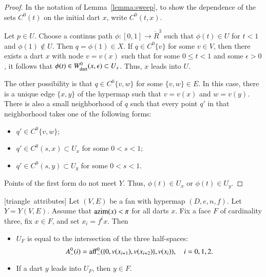 \begin{proof}  
In the notation of Lemma~\ref{lemma:sweep}, to show the dependence of the sets $C^0(t)$ on the initial dart $x$, write $C^0(t,x)$.

Let $p\in U$.  Choose a continus path $\phi:[0,1]\to \ring{R}^3$
such that $\phi(t)\in U$ for $t<1$ and $\phi(1)\not\in U$.  Then
$q=\phi(1)\in X$.  If $q\in C^0\{v\}$ for some $v\in V$,
then there exists a dart $x$ with node $v = v(x)$ such that for some $0\le t < 1$ and some $\epsilon>0$, it follows that $\phi(t)\in W^0_{\text{dart}}(x,\epsilon)\subset U_x$.  
Thus, $x$ leads into $U$.

The other possibility is that
$q\in C^0\{v,w\}$ for some $\{v,w\}\in E$.  In this case, there is a unique
edge $\{x,y\}$ of the hypermap such that $v=v(x)$ and $w=v(y)$.  
There
is also a small neighborhood of $q$ such that every point $q'$ in that neighborhood
takes one of the following forms:
\begin{itemize} \item $q'\in C^0\{v,w\}$;
\item $q'\in C^0(s,x)\subset U_x$ for some $0<s<1$;
\item $q'\in C^0(s,y)\subset U_y$ for some $0<s<1$.
\end{itemize}
Points of the first form do not meet $Y$.  Thus,  $\phi(t)\in U_x$ or $\phi(t)\in U_y$.  
\end{proof}

\begin{lemma}[triangle~attributes] \label{lemma:triangle}
Let $(V,E)$ be a fan with hypermap $(D,e,n,f)$. 
Let $Y=Y(V,E)$.
Assume that ${\operatorname{azim}}(x)<\pi$
for all darts $x$.  Fix a face $F$ of cardinality three, fix
$x\in F$, and set $x_i = f^i x$. Then
\begin{itemize}  
\item $U_F$ is equal to the intersection of the three half-spaces:
$$A^0_-(i)={\operatorname{aff}}_-^0(\{0,v(x_{i+1}),v(x_{i+2})\},v(x_i)),\quad i=0,1,2.$$
\item If a dart $y$ leads into $U_F$, then $y\in F$.
\end{itemize}
\end{lemma}

